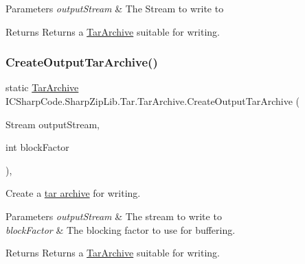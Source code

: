 \begin{DoxyParams}{Parameters}
{\em output\+Stream} & The Stream to write to\\
\hline
\end{DoxyParams}
\begin{DoxyReturn}{Returns}
Returns a \hyperlink{class_i_c_sharp_code_1_1_sharp_zip_lib_1_1_tar_1_1_tar_archive}{Tar\+Archive} suitable for writing.
\end{DoxyReturn}
\mbox{\label{class_i_c_sharp_code_1_1_sharp_zip_lib_1_1_tar_1_1_tar_archive_ac3bc486e99de8a492986280c40f0c04b}} 
\subsubsection{\texorpdfstring{Create\+Output\+Tar\+Archive()}{CreateOutputTarArchive()}\hspace{0.1cm}{\footnotesize\ttfamily [2/2]}}
{\footnotesize\ttfamily static \hyperlink{class_i_c_sharp_code_1_1_sharp_zip_lib_1_1_tar_1_1_tar_archive}{Tar\+Archive} I\+C\+Sharp\+Code.\+Sharp\+Zip\+Lib.\+Tar.\+Tar\+Archive.\+Create\+Output\+Tar\+Archive (\begin{DoxyParamCaption}\item[{Stream}]{output\+Stream,  }\item[{int}]{block\+Factor }\end{DoxyParamCaption})\hspace{0.3cm}{\ttfamily [inline]}, {\ttfamily [static]}}



Create a \hyperlink{class_i_c_sharp_code_1_1_sharp_zip_lib_1_1_tar_1_1_tar_archive}{tar archive} for writing. 


\begin{DoxyParams}{Parameters}
{\em output\+Stream} & The stream to write to\\
\hline
{\em block\+Factor} & The blocking factor to use for buffering.\\
\hline
\end{DoxyParams}
\begin{DoxyReturn}{Returns}
Returns a \hyperlink{class_i_c_sharp_code_1_1_sharp_zip_lib_1_1_tar_1_1_tar_archive}{Tar\+Archive} suitable for writing.
\end{DoxyReturn}
\mbox{\label{class_i_c_sharp_code_1_1_sharp_zip_lib_1_1_tar_1_1_tar_archive_a756966758e4d6f3ca9bb9530edac3ea4}} 
